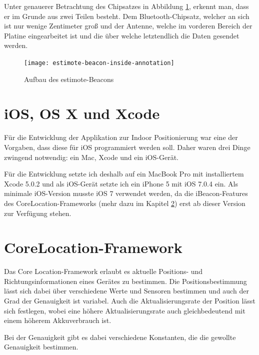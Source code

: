 Unter genauerer Betrachtung des Chipsatzes in Abbildung \ref{estimote-beacon-inside-annotations}, erkennt man, dass er im Grunde aus zwei Teilen besteht.
Dem Bluetooth-Chipsatz, welcher an sich ist nur wenige Zentimeter groß und der Antenne, welche im vorderen Bereich der Platine eingearbeitet ist und die über welche letztendlich die Daten gesendet werden.

\begin{figure}[h!]
	\centering
	\texttt{[image: estimote-beacon-inside-annotation]}
	\caption{Aufbau des estimote-Beacons}
	\label{estimote-beacon-inside-annotations}
\end{figure}



\section{iOS, OS X und Xcode}
\label{sec:technologies:iosandxcode}
Für die Entwicklung der Applikation zur Indoor Positionierung war eine der Vorgaben, dass diese für iOS programmiert werden soll.
Daher waren drei Dinge zwingend notwendig: ein Mac, Xcode und ein iOS-Gerät.

Für die Entwicklung setzte ich deshalb auf ein MacBook Pro mit installiertem Xcode 5.0.2 und als iOS-Gerät setzte ich ein iPhone 5 mit iOS 7.0.4 ein.
Als minimale iOS-Version musste iOS 7 verwendet werden, da die iBeacon-Features des CoreLocation-Frameworks (mehr dazu im Kapitel \ref{sec:technologies:corelocation}) erst ab dieser Version zur Verfügung stehen.


\section{CoreLocation-Framework}
\label{sec:technologies:corelocation}
Das Core Location-Framework erlaubt es aktuelle Positions- und Richtungsinformationen eines Gerätes zu bestimmen.
Die Positionsbestimmung lässt sich dabei über verschiedene Werte und Sensoren bestimmen und auch der Grad der Genauigkeit ist variabel.
Auch die Aktualisierungsrate der Position lässt sich festlegen, wobei eine höhere Aktualisierungsrate auch gleichbedeutend mit einem höherem Akkuverbrauch ist.

Bei der Genauigkeit gibt es dabei verschiedene Konstanten, die die gewollte Genauigkeit bestimmen. 


